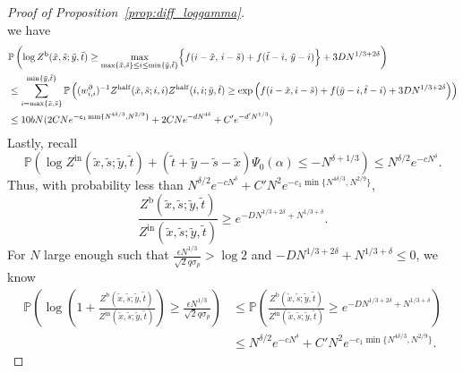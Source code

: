 \documentclass[11pt]{article}
\theoremstyle{definition}
\newcommand{\Prob}{\mathbb{P}}
\newcommand{\Zhalf}{Z^{\mathrm{half}}}
\newcommand{\Zin}{Z^{\mathrm{in}}}
\newcommand{\Zb}{Z^{\mathrm{b}}}
\begin{document}
\begin{proof}[Proof of Proposition~\ref{prop:diff_loggamma}]
\[\]
we have
\[
\begin{aligned}
&\Prob\left(\log \Zb(\tilde{x}, \tilde{s};\tilde{y}, \tilde{t}) \geq  \max_{\max\{\tilde{x}, \tilde{s}\}\leq i \leq \min\{\tilde{y}, \tilde{t}\}}
\Bigl\{
f(i-\tilde x,\, i-\tilde s)
+
f(\tilde t-i,\, \tilde y-i)
\Bigr\}+ 3DN^{1/3+2\delta}\right) \\
&\leq \sum_{i = \max\{\tilde{x}, \tilde{s}\}}^{ \min\{\tilde{y}, \tilde{t}\}}  \Prob \left(({w_{i,i}^\partial})^{-1}\Zhalf(\tilde{x},\tilde{s};i,i)\Zhalf(i,i;\tilde{y},\tilde{t}) \geq \exp\left( f(i-\tilde{x}, i-\tilde{s})+ f(\tilde{y}- i, \tilde{t}-i) + 3DN^{1/3+2\delta}\right) \right)\\
&\leq 10bN(2CNe^{-c_1 \min \{N^{4\delta/3}, N^{2/9}\}} + 2CNe^{-dN^{4\delta}} + C'e^{-d'N^{1/3}})
\end{aligned}
\]
Lastly, recall 
\[
 \Prob(\log \Zin(\tilde{x}, \tilde{s};\tilde{y}, \tilde{t}) + (\tilde{t}+\tilde{y}-\tilde{s}-\tilde{x})\Psi_0(\alpha) \leq -N^{\delta + 1/3}) \leq N^{\delta/2}e^{-cN^{\delta}}.
\]
Thus, with probability less than $N^{\delta/2}e^{-cN^{\delta}} + C'N^2e^{-c_1 \min \{N^{4\delta/3}, N^{2/9}\}}$,
\begin{equation}
    \frac{\Zb(\tilde{x}, \tilde{s};\tilde{y}, \tilde{t})}{\Zin(\tilde{x}, \tilde{s};\tilde{y}, \tilde{t})} \geq e^{-DN^{1/3+2\delta} + N^{1/3 + \delta}}.
\end{equation}
For $N$ large enough such that $\frac{\epsilon N^{1/3}}{\sqrt{2}q\sigma_p} > \log 2$ and ${-D N^{1/3 + 2\delta} + N^{1/3 + \delta}} \leq 0$, we know
\[
\begin{aligned}
    \Prob \left( \log\left(1+ \frac{\Zb(\tilde{x}, \tilde{s};\tilde{y}, \tilde{t})}{\Zin(\tilde{x}, \tilde{s};\tilde{y}, \tilde{t})}\right) \geq \frac{\epsilon N^{1/3}}{\sqrt{2}q\sigma_p}\right) &
    \leq \Prob \left(  \frac{\Zb(\tilde{x}, \tilde{s};\tilde{y}, \tilde{t})}{\Zin(\tilde{x}, \tilde{s};\tilde{y}, \tilde{t})} \geq e^{-DN^{1/3+2\delta} + N^{1/3 + \delta}} \right)\\
    &\leq N^{\delta/2}e^{-cN^{\delta}} + C'N^2e^{-c_1 \min \{N^{4\delta/3}, N^{2/9}\}}.
\end{aligned}
\]

\end{proof}
\end{document}
